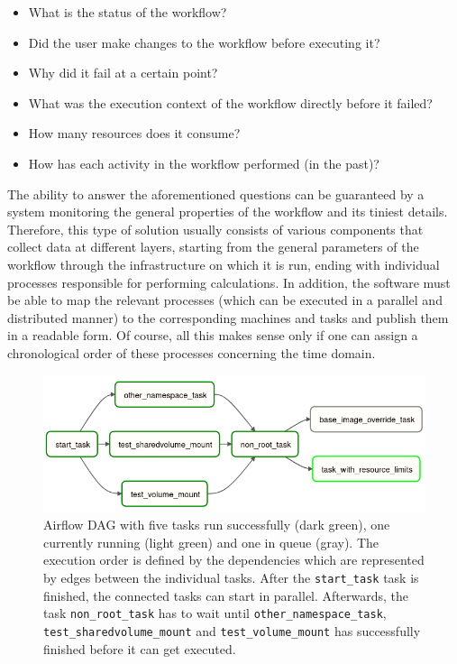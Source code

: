 \documentclass[a4paper,journal]{IEEEtran}
\begin{document}
\begin{itemize}
  \item What is the status of the workflow?
  \item Did the user make changes to the workflow before executing it?
  \item Why did it fail at a certain point?
  \item What was the execution context of the workflow directly before it failed?
  \item How many resources does it consume?
  \item How has each activity in the workflow performed (in the past)?
\end{itemize}

The ability to answer the aforementioned questions can be guaranteed by a system monitoring the general properties of the workflow and its tiniest details. Therefore, this type of solution usually consists of various components that collect data at different layers, starting from the general parameters of the workflow through the infrastructure on which it is run, ending with individual processes responsible for performing calculations. In addition, the software must be able to map the relevant processes (which can be executed in a parallel and distributed manner) to the corresponding machines and tasks and publish them in a readable form. Of course, all this makes sense only if one can assign a chronological order of these processes concerning the time domain.

\begin{figure}[b]
    \centering
	\includegraphics[width=0.7\linewidth]{images/airflow-dag.png}
	\caption{Airflow DAG with five tasks run successfully (dark green), one currently running (light green) and one in queue (gray). The execution order is defined by the dependencies which are represented by edges between the individual tasks. After the \texttt{start\_task} task is finished, the connected tasks can start in parallel. Afterwards, the task \texttt{non\_root\_task} has to wait until \texttt{other\_namespace\_task}, \texttt{test\_sharedvolume\_mount} and \texttt{test\_volume\_mount} has successfully finished before it can get executed.}
	\label{fig:aiflow:dag}
\end{figure}
\end{document}
